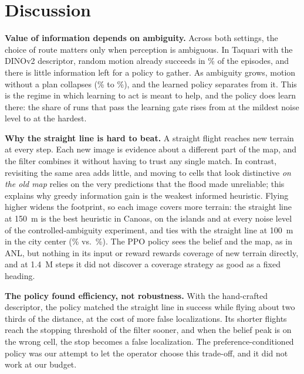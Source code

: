\section{Discussion}
\label{sec:discussion}

\textbf{Value of information depends on ambiguity.}
Across both settings, the choice of route matters only when perception is ambiguous. In Taquari with the DINOv2 descriptor, random motion already succeeds in \vThreeTaqSTwoRandom\% of the episodes, and there is little information left for a policy to gather. As ambiguity grows, motion without a plan collapses (\eSuccRandLZero\% to \eSuccRandLThree\%), and the learned policy separates from it. This is the regime in which learning to act is meant to help, and the policy does learn there: the share of runs that pass the learning gate rises from \eGateLOne{} at the mildest noise level to \eGateLThree{} at the hardest.

\textbf{Why the straight line is hard to beat.}
A straight flight reaches new terrain at every step. Each new image is evidence about a different part of the map, and the filter combines it without having to trust any single match. In contrast, revisiting the same area adds little, and moving to cells that look distinctive \emph{on the old map} relies on the very predictions that the flood made unreliable; this explains why greedy information gain is the weakest informed heuristic. Flying higher widens the footprint, so each image covers more terrain: the straight line at 150~m is the best heuristic in Canoas, on the islands and at every noise level of the controlled-ambiguity experiment, and ties with the straight line at 100~m in the city center (\vThreeCenterStraightHigh\% vs.\ \vThreeCenterStraight\%). The PPO policy sees the belief and the map, as in ANL, but nothing in its input or reward rewards coverage of new terrain directly, and at 1.4~M steps it did not discover a coverage strategy as good as a fixed heading.

\textbf{The policy found efficiency, not robustness.}
With the hand-crafted descriptor, the policy matched the straight line in success while flying about two thirds of the distance, at the cost of more false localizations. Its shorter flights reach the stopping threshold of the filter sooner, and when the belief peak is on the wrong cell, the stop becomes a false localization. The preference-conditioned policy was our attempt to let the operator choose this trade-off, and it did not work at our budget.

